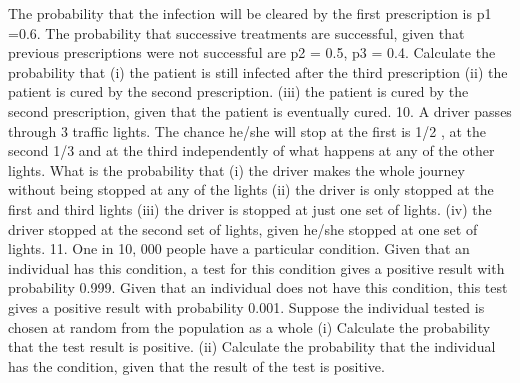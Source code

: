 The probability that the infection will be cleared by the first prescription is p1 =0.6. The probability
that successive treatments are successful, given that previous prescriptions were not successful are p2 =
0.5, p3 = 0.4. Calculate the probability that
(i) the patient is still infected after the third prescription
(ii) the patient is cured by the second prescription.
(iii) the patient is cured by the second prescription, given that the patient is eventually cured.
10. A driver passes through 3 traffic lights. The chance he/she will stop at the first is 1/2 , at the second
1/3 and at the third independently of what happens at any of the other lights.
What is the probability that
(i) the driver makes the whole journey without being stopped at any of the lights
(ii) the driver is only stopped at the first and third lights
(iii) the driver is stopped at just one set of lights.
(iv) the driver stopped at the second set of lights, given he/she stopped at one set of lights.
11. One in 10, 000 people have a particular condition. Given that an individual has this condition, a test for
this condition gives a positive result with probability 0.999. Given that an individual does not have this
condition, this test gives a positive result with probability 0.001.
Suppose the individual tested is chosen at random from the population as a whole
(i) Calculate the probability that the test result is positive.
(ii) Calculate the probability that the individual has the condition, given that the result of the test is
positive.

